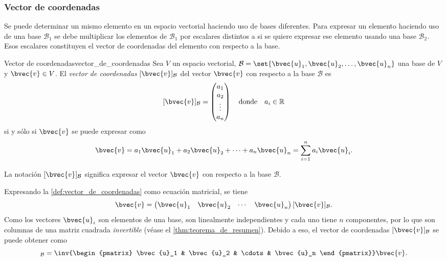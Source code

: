 \documentclass{fmbnotes}
\begin{document}
\subsubsection{Vector de coordenadas}\label{sssec:vector_de_coordenadas}

Se puede determinar un mismo elemento en un espacio vectorial haciendo uso de bases diferentes. Para expresar un elemento haciendo uso de una base \(\mathcal{B}_1\) se debe multiplicar los elementos de \(\mathcal{B}_1\) por escalares distintos a si se quiere expresar ese elemento usando una base \(\mathcal{B}_2\). Esos escalares constituyen el vector de coordenadas del elemento con respecto a la base.

\begin{definicion}{Vector de coordenadas}{vector_de_coordenadas}
Sea \(V\) un espacio vectorial, \(\mathcal{B}=\set{\bvec{u}_1,\bvec{u}_2,\ldots,\bvec{u}_n}\) una base de \(V\) y \(\bvec{v} \in V\). El \emph{vector de coordenadas} \([\bvec{v}]_\mathcal{B}\) del vector \(\bvec{v}\) con respecto a la base \(\mathcal{B}\) es
\[[\bvec{v}]_\mathcal{B}=\begin{pmatrix}
	a_1 \\ a_2\\ \vdots \\ a_n
\end{pmatrix}\quad \text{donde} \quad a_i \in \mathbb{R}\]
si y sólo si \(\bvec{v}\) se puede expresar como
\[\bvec{v}=a_1\bvec{u}_1+a_2\bvec{u}_2+\cdots+a_n\bvec{u}_n=\sum_{i=1}^{n}a_i\bvec{u}_i.\] 
\end{definicion}

\begin{notacion}
	La notación \( [\bvec{v}]_\mathcal{B} \) significa expresar el vector \(\bvec{v}\) con respecto a la base \(\mathcal{B}\).
\end{notacion}

Expresando la \autoref{def:vector_de_coordenadas} como ecuación matricial, se tiene
\[\bvec{v}=\begin{pmatrix}
\bvec{u}_1 & \bvec{u}_2 & \cdots & \bvec{u}_n
\end{pmatrix}[\bvec{v}]_\mathcal{B}.\]
Como los vectores \(\bvec{u}_i\) son elementos de una base, son linealmente independientes y cada uno tiene \(n\) componentes, por lo que son columnas de una matriz cuadrada \emph{invertible} (véase el \autoref{thm:teorema_de_resumen}). Debido a eso, el vector de coordenadas \([\bvec{v}]_\mathcal{B}\) se puede obtener como
\begin{equation}
[\bvec{v}]_\mathcal{B}=\inv{\begin{pmatrix}
\bvec{u}_1 & \bvec{u}_2 & \cdots & \bvec{u}_n
\end{pmatrix}}\bvec{v}.
\label{eq:vector_de_coordenadas_como_ecuacion_matricial}
\end{equation}
\end{document}
